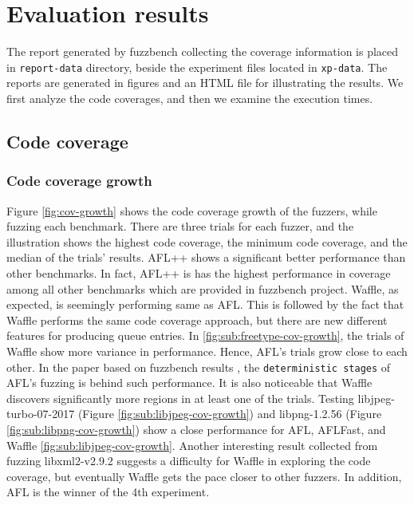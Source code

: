\section{Evaluation results}
\label{sec:ch4-report}

The report generated by fuzzbench collecting the coverage information is placed in \texttt{report-data} directory, beside the experiment files located in \texttt{xp-data}. The reports are generated in figures and an HTML file for illustrating the results. We first analyze the code coverages, and then we examine the execution times.

\subsection{Code coverage}

\subsubsection{Code coverage growth}

Figure \ref{fig:cov-growth} shows the code coverage growth of the fuzzers, while fuzzing each benchmark. There are three trials for each fuzzer, and the illustration shows the highest code coverage, the minimum code coverage, and the median of the trials' results. AFL++ shows a significant better performance than other benchmarks. In fact, AFL++ is has the highest performance in coverage among all other benchmarks which are provided in fuzzbench project. Waffle, as expected, is seemingly performing same as AFL. This is followed by the fact that Waffle performs the same code coverage approach, but there are new different features for producing queue entries. In \ref{fig:sub:freetype-cov-growth}, the trials of Waffle show more variance in performance. Hence, AFL's trials grow close to each other. In the paper based on fuzzbench results \cite{metzman2021fuzzbench}, the \texttt{deterministic stages} of AFL's fuzzing is behind such performance. It is also noticeable that Waffle discovers significantly more regions in at least one of the trials. Testing libjpeg-turbo-07-2017 (Figure \ref{fig:sub:libjpeg-cov-growth}) and libpng-1.2.56 (Figure \ref{fig:sub:libpng-cov-growth}) show a close performance for AFL, AFLFast, and Waffle \ref{fig:sub:libjpeg-cov-growth}. Another interesting result collected from fuzzing libxml2-v2.9.2 suggests a difficulty for Waffle in exploring the code coverage, but eventually Waffle gets the pace closer to other fuzzers. In addition, AFL is the winner of the 4th experiment.

